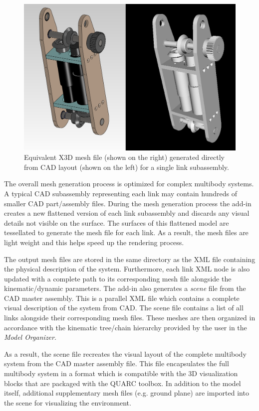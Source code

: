 \begin{figure}[!h]
	\centering
    \includegraphics[scale=0.5]{fig/toolchain/cad2x3d.png}
  	\caption{Equivalent X3D mesh file (shown on the right) generated directly from CAD layout (shown on the left) for a single link subassembly.}
	\label{fig:meshfile}
\end{figure}

The overall mesh generation process is optimized for complex multibody systems. A typical CAD subassembly representing each link may contain hundreds of smaller CAD part/assembly files. During the mesh generation process the add-in creates a new flattened version of each link subassembly and discards any visual details not visible on the surface. The surfaces of this flattened model are tessellated to generate the mesh file for each link. As a result, the mesh files are light weight and this helps speed up the rendering process.

The output mesh files are stored in the same directory as the XML file containing the physical description of the system. Furthermore, each link XML node is also updated with a complete path to its corresponding mesh file alongside the kinematic/dynamic parameters. The add-in also generates a \emph{scene} file from the CAD master assembly. This is a parallel XML file which contains a complete visual description of the system from CAD. The scene file contains a list of all links alongside their corresponding mesh files. These meshes are then organized in accordance with the kinematic tree/chain hierarchy provided by the user in the \emph{Model Organizer}.

As a result, the scene file recreates the visual layout of the complete multibody system from the CAD master assembly file. This file encapsulates the full multibody system in a format which is compatible with the 3D visualization blocks that are packaged with the QUARC toolbox. In addition to the model itself, additional supplementary mesh files (e.g. ground plane) are imported into the scene for visualizing the environment.


